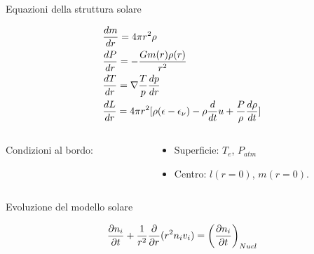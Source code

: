 \documentclass[10pt,xcolor={usenames},fleqn,mathserif,serif]{beamer}
\begin{document}
\begin{frame}{Equazioni della struttura solare}

\begin{subequations}%
\begin{align*}
&\TDy{r}{m}=4\pi r^2\rho\\
&\TDy{r}{P}=-\frac{Gm(r)\rho(r)}{r^2}\\
&\TDy{r}{T}=\nabla\frac{T}{p}\TDy{r}{p}\\
&\TDy{r}{L}=4\pi r^2[\rho(\epsilon-\epsilon_{\nu})-\rho\TDof{t}u+\frac{P}{\rho}\TDy{t}{\rho}]
\end{align*}
\end{subequations}

\begin{columns}

\begin{column}{0.3\textwidth}
Condizioni al bordo:
\end{column}

\begin{column}{0.5\textwidth}
\begin{itemize}
    \item Superficie: $T_e$, $P_{atm}$
    \item Centro: $l(r=0)$, $m(r=0)$.
\end{itemize}

\end{column}

\end{columns}

\begin{block}{Evoluzione del modello solare}

\begin{equation*}
\PDy{t}{n_i}+\frac{1}{r^2}\PDof{r}(r^2n_iv_i)=\Dcvar{\PDy{t}{n_i}}{Nucl}%
\end{equation*}

\end{block}

\end{frame}
\end{document}
